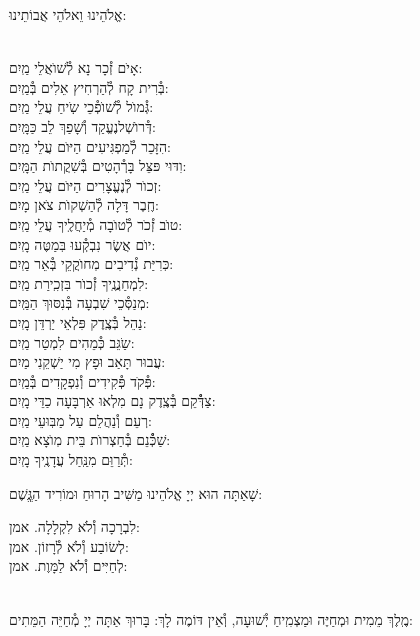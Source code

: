 \documentclass[twoside, openany, parskip=half, 11pt]{book}
\begin{document}
\begin{small}אֱלֹהֵינוּ וֵאלֹהֵי אֲבוֹתֵינוּ:\end{small}\\
אָיׂם זְ֯כָר נָא לְ֯שׁוׂאֲלֵי \hfill מַֽיִם:\\
בְּ֯רִית קָח לְ֯הַרְחִיץ אֵלִים \hfill בְּ֯מַֽיִם:\\
גְּ֯מוׂל לְ֯שׁוׂפְ֯כֵי שִֹֽיחַ עֲלֵי \hfill מַֽיִם:\\
דְּ֯רוׂשְׁלנֶעֱקַד וְ֯שָׁפַךְ לֵב \hfill כַּמָּֽיִם:\\
הִזָּכֵר לְ֯מַפְגִּיעִים הַיּוׂם עֲלֵי \hfill מַֽיִם:\\
וִדּוּי פּצֵּל בָּרְ֯הָטִים בְּ֯שִׁקֲתוׂת \hfill הַמָּֽיִם:\\
זְכוׂר לְ֯נֶעֱצָרִים הַיּוׂם עֲלֵי \hfill מַֽיִם:\\
חֶֽבֶר דָּלָה לְ֯הַשְׁקוׂת צׂאן \hfill מָיִם:\\
טוׂב זְ֯כׂר לְ֯טוׂבָה מְ֯יַחֲלֶֽיךָ עֲלֵי \hfill מַֽיִם:\\
יוׂם אֲשֶׂר נִבְקְ֯עוּ בּֽמַטֶּה \hfill מָֽיִם:\\
כּֽרִיַּת נְ֯דִיבִים מֽחוׂקֲקֵי בְּ֯אֵר \hfill מַֽיִם:\\
לִמְחַנֲנֶֽיךָ זְ֯כוׂר בִּזְכִֽירַת \hfill מַֽיִם:\\
מְנַסְּ֯כֵי שִׁבְעָה בְּ֯נִסּוּךְ \hfill הַמַּֽיִם:\\
נַהֵל בְּ֯צֶֽדֶק פִּלְאֵי יַרְדֵּן \hfill מָֽיִם:\\
שַֹגֵּב כְּ֯מֵהִים לִמְטַר \hfill מַֽיִם:\\
עֲבוּר תָּאַב וּפָץ מִי יַשְׁקֵנִי \hfill מַיִם:\\
פְּ֯קׂד פְּ֯קִידִים וְ֯נִפְקָדִים \hfill בְּ֯מַֽיִם:\\
צַדְּ֯֯קֵם בְּ֯צֶֽדֶק נָם מִלְאוּ אַרְבָּעָה כַדֵּי \hfill מָֽיִם:\\
רְעֵם וְ֯נַהֲלֵם עַל מַבּֽוּעֵי \hfill מַֽיִם:\\
שַׁכְּ֯֯נֵם בְּ֯חַצְרוׂת בֵּית מֽוׂצָא \hfill מַֽיִם:\\
תְּ֯רַוֵּם מִנַּֽחַל עֲדָנֶֽיךָ \hfill מָֽיִם:

שָׁאַתָּה הוּא יְיָ אֱלֹהֵינוּ מַשִּׁיב הָרוּחַ וּמוֹרִיד הַגֱּֽשֶׁם:

לִבְרָכָה וְ֯לֹא לִקְלָלָה. \hfill אמן:\\
לְשׂוֹבַע וְ֯לֹא לְ֯רָזוֹן. \hfill אמן:\\
לְחַיִּים וְ֯לֹא לַמָּוֶת. \hfill אמן:

\\
מֶֽלֶךְ מֵמִית וּמְחַיֶּה וּמַצְמִֽיחַ יְ֯שׁוּעָה, וְ֯אֵין דּוֹמֶה לָךְ: בָּרוּךְ אַתָּה יְיָ מְ֯חַיֵּה הַמֵּתִים:
\end{document}
